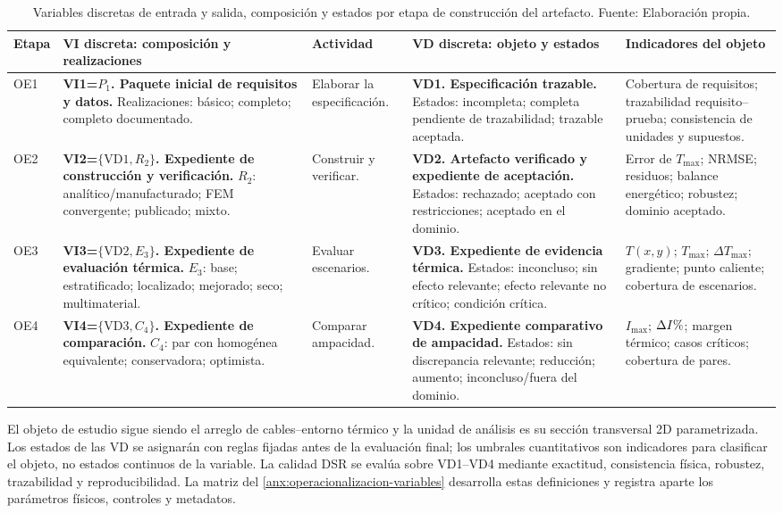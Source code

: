 \documentclass[11pt,a4paper,oneside]{report}
\renewcommand{\arraystretch}{1.18}
\newcommand{\Tmax}{T_{\max}}
\newcommand{\Imax}{I_{\max}}
\newcommand{\pct}{\mbox{\char37}}
\begin{document}
\begin{table}[H]
\centering
\caption{Variables discretas de entrada y salida, composición y estados por etapa de construcción del artefacto. Fuente: Elaboración propia.}
\label{tab:dimensiones-operativas}
\begingroup
\scriptsize
\setlength{\tabcolsep}{3pt}
\renewcommand{\arraystretch}{1.42}
\begin{tabularx}{\textwidth}{L{1.10cm}L{4.25cm}L{2.15cm}L{4.25cm}Y}
\toprule
\textbf{Etapa} & \textbf{VI discreta: composición y realizaciones} & \textbf{Actividad} & \textbf{VD discreta: objeto y estados} & \textbf{Indicadores del objeto} \\
\midrule
OE1 & \textbf{VI1=$P_1$. Paquete inicial de requisitos y datos.} Realizaciones: básico; completo; completo documentado. & Elaborar la especificación. & \textbf{VD1. Especificación trazable.} Estados: incompleta; completa pendiente de trazabilidad; trazable aceptada. & Cobertura de requisitos; trazabilidad requisito--prueba; consistencia de unidades y supuestos. \\
OE2 & \textbf{VI2=$\{\mathrm{VD1},R_2\}$. Expediente de construcción y verificación.} $R_2$: analítico/manufacturado; FEM convergente; publicado; mixto. & Construir y verificar. & \textbf{VD2. Artefacto verificado y expediente de aceptación.} Estados: rechazado; aceptado con restricciones; aceptado en el dominio. & Error de $\Tmax$; NRMSE; residuos; balance energético; robustez; dominio aceptado. \\
OE3 & \textbf{VI3=$\{\mathrm{VD2},E_3\}$. Expediente de evaluación térmica.} $E_3$: base; estratificado; localizado; mejorado; seco; multimaterial. & Evaluar escenarios. & \textbf{VD3. Expediente de evidencia térmica.} Estados: inconcluso; sin efecto relevante; efecto relevante no crítico; condición crítica. & $T(x,y)$; $\Tmax$; $\Delta\Tmax$; gradiente; punto caliente; cobertura de escenarios. \\
OE4 & \textbf{VI4=$\{\mathrm{VD3},C_4\}$. Expediente de comparación.} $C_4$: par con homogénea equivalente; conservadora; optimista. & Comparar ampacidad. & \textbf{VD4. Expediente comparativo de ampacidad.} Estados: sin discrepancia relevante; reducción; aumento; inconcluso/fuera del dominio. & $\Imax$; $\Delta I\pct$; margen térmico; casos críticos; cobertura de pares. \\
\bottomrule
\end{tabularx}
\endgroup
\end{table}

El objeto de estudio sigue siendo el arreglo de cables--entorno térmico y la unidad de análisis es su sección transversal 2D parametrizada. Los estados de las VD se asignarán con reglas fijadas antes de la evaluación final; los umbrales cuantitativos son indicadores para clasificar el objeto, no estados continuos de la variable. La calidad DSR se evalúa sobre VD1--VD4 mediante exactitud, consistencia física, robustez, trazabilidad y reproducibilidad. La matriz del \ref{anx:operacionalizacion-variables} desarrolla estas definiciones y registra aparte los parámetros físicos, controles y metadatos.
\end{document}
